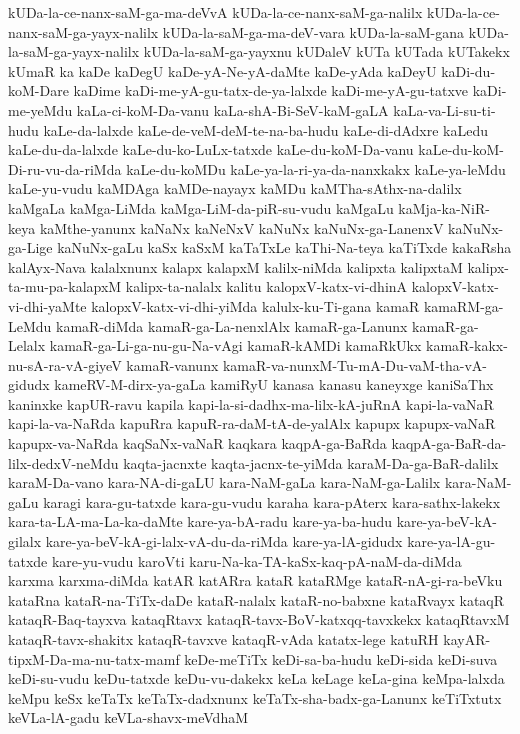 {kUDa-la-ce-nanx-saM-ga-ma-deVvA
kUDa-la-ce-nanx-saM-ga-nalilx
kUDa-la-ce-nanx-saM-ga-yayx-nalilx
kUDa-la-saM-ga-ma-deV-vara
kUDa-la-saM-gana
kUDa-la-saM-ga-yayx-nalilx
kUDa-la-saM-ga-yayxnu
kUDaleV
kUTa
kUTada
kUTakekx
kUmaR
ka
kaDe
kaDegU
kaDe-yA-Ne-yA-daMte
kaDe-yAda
kaDeyU
kaDi-du-koM-Dare
kaDime
kaDi-me-yA-gu-tatx-de-ya-lalxde
kaDi-me-yA-gu-tatxve
kaDi-me-yeMdu
kaLa-ci-koM-Da-vanu
kaLa-shA-Bi-SeV-kaM-gaLA
kaLa-va-Li-su-ti-hudu
kaLe-da-lalxde
kaLe-de-veM-deM-te-na-ba-hudu
kaLe-di-dAdxre
kaLedu
kaLe-du-da-lalxde
kaLe-du-ko-LuLx-tatxde
kaLe-du-koM-Da-vanu
kaLe-du-koM-Di-ru-vu-da-riMda
kaLe-du-koMDu
kaLe-ya-la-ri-ya-da-nanxkakx
kaLe-ya-leMdu
kaLe-yu-vudu
kaMDAga
kaMDe-nayayx
kaMDu
kaMTha-sAthx-na-dalilx
kaMgaLa
kaMga-LiMda
kaMga-LiM-da-piR-su-vudu
kaMgaLu
kaMja-ka-NiR-keya
kaMthe-yanunx
kaNaNx
kaNeNxV
kaNuNx
kaNuNx-ga-LanenxV
kaNuNx-ga-Lige
kaNuNx-gaLu
kaSx
kaSxM
kaTaTxLe
kaThi-Na-teya
kaTiTxde
kakaRsha
kalAyx-Nava
kalalxnunx
kalapx
kalapxM
kalilx-niMda
kalipxta
kalipxtaM
kalipx-ta-mu-pa-kalapxM
kalipx-ta-nalalx
kalitu
kalopxV-katx-vi-dhinA
kalopxV-katx-vi-dhi-yaMte
kalopxV-katx-vi-dhi-yiMda
kalulx-ku-Ti-gana
kamaR
kamaRM-ga-LeMdu
kamaR-diMda
kamaR-ga-La-nenxlAlx
kamaR-ga-Lanunx
kamaR-ga-Lelalx
kamaR-ga-Li-ga-nu-gu-Na-vAgi
kamaR-kAMDi
kamaRkUkx
kamaR-kakx-nu-sA-ra-vA-giyeV
kamaR-vanunx
kamaR-va-nunxM-Tu-mA-Du-vaM-tha-vA-gidudx
kameRV-M-dirx-ya-gaLa
kamiRyU
kanasa
kanasu
kaneyxge
kaniSaThx
kaninxke
kapUR-ravu
kapila
kapi-la-si-dadhx-ma-lilx-kA-juRnA
kapi-la-vaNaR
kapi-la-va-NaRda
kapuRra
kapuR-ra-daM-tA-de-yalAlx
kapupx
kapupx-vaNaR
kapupx-va-NaRda
kaqSaNx-vaNaR
kaqkara
kaqpA-ga-BaRda
kaqpA-ga-BaR-da-lilx-dedxV-neMdu
kaqta-jacnxte
kaqta-jacnx-te-yiMda
karaM-Da-ga-BaR-dalilx
karaM-Da-vano
kara-NA-di-gaLU
kara-NaM-gaLa
kara-NaM-ga-Lalilx
kara-NaM-gaLu
karagi
kara-gu-tatxde
kara-gu-vudu
karaha
kara-pAterx
kara-sathx-lakekx
kara-ta-LA-ma-La-ka-daMte
kare-ya-bA-radu
kare-ya-ba-hudu
kare-ya-beV-kA-gilalx
kare-ya-beV-kA-gi-lalx-vA-du-da-riMda
kare-ya-lA-gidudx
kare-ya-lA-gu-tatxde
kare-yu-vudu
karoVti
karu-Na-ka-TA-kaSx-kaq-pA-naM-da-diMda
karxma
karxma-diMda
katAR
katARra
kataR
kataRMge
kataR-nA-gi-ra-beVku
kataRna
kataR-na-TiTx-daDe
kataR-nalalx
kataR-no-babxne
kataRvayx
kataqR
kataqR-Baq-tayxva
kataqRtavx
kataqR-tavx-BoV-katxqq-tavxkekx
kataqRtavxM
kataqR-tavx-shakitx
kataqR-tavxve
kataqR-vAda
katatx-lege
katuRH
kayAR-tipxM-Da-ma-nu-tatx-mamf
keDe-meTiTx
keDi-sa-ba-hudu
keDi-sida
keDi-suva
keDi-su-vudu
keDu-tatxde
keDu-vu-dakekx
keLa
keLage
keLa-gina
keMpa-lalxda
keMpu
keSx
keTaTx
keTaTx-dadxnunx
keTaTx-sha-badx-ga-Lanunx
keTiTxtutx
keVLa-lA-gadu
keVLa-shavx-meVdhaM
}
